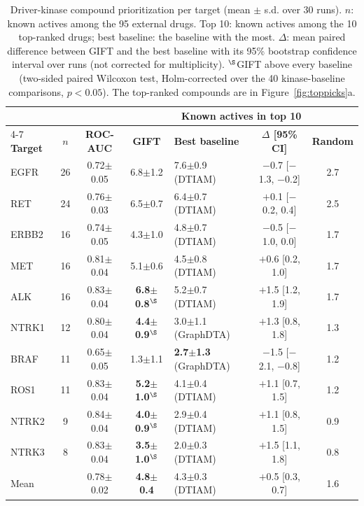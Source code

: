 \documentclass[10pt,letterpaper]{article}
\begin{document}
\begin{table}[t]
\centering
\caption{Driver-kinase compound prioritization per target (mean $\pm$ s.d. over 30 runs). $n$: known actives among the 95 external drugs. Top 10: known actives among the 10 top-ranked drugs; best baseline: the baseline with the most. $\Delta$: mean paired difference between GIFT and the best baseline with its 95\% bootstrap confidence interval over runs (not corrected for multiplicity). $^{\S}$GIFT above every baseline (two-sided paired Wilcoxon test, Holm-corrected over the 40 kinase-baseline comparisons, $p<0.05$). The top-ranked compounds are in Figure~\ref{fig:toppicks}a.}
\label{tab:leadprio_kinases}
\footnotesize
\setlength{\tabcolsep}{3.5pt}
\begin{tabular}{l c c c l c c}
\toprule
 & & & \multicolumn{4}{c}{\textbf{Known actives in top 10}} \\
\cmidrule(lr){4-7}
\textbf{Target} & $n$ & \textbf{ROC-AUC} & \textbf{GIFT} & \textbf{Best baseline} & \textbf{$\Delta$ [95\% CI]} & \textbf{Random} \\
\midrule
EGFR & 26 & 0.72$\pm$0.05 & 6.8$\pm$1.2 & 7.6$\pm$0.9 (DTIAM) & $-$0.7 [$-$1.3, $-$0.2] & 2.7 \\
RET & 24 & 0.76$\pm$0.03 & 6.5$\pm$0.7 & 6.4$\pm$0.7 (DTIAM) & $+$0.1 [$-$0.2, 0.4] & 2.5 \\
ERBB2 & 16 & 0.74$\pm$0.05 & 4.3$\pm$1.0 & 4.8$\pm$0.7 (DTIAM) & $-$0.5 [$-$1.0, 0.0] & 1.7 \\
MET & 16 & 0.81$\pm$0.04 & 5.1$\pm$0.6 & 4.5$\pm$0.8 (DTIAM) & $+$0.6 [0.2, 1.0] & 1.7 \\
ALK & 16 & 0.83$\pm$0.04 & \textbf{6.8$\pm$0.8}$^{\S}$ & 5.2$\pm$0.7 (DTIAM) & $+$1.5 [1.2, 1.9] & 1.7 \\
NTRK1 & 12 & 0.80$\pm$0.04 & \textbf{4.4$\pm$0.9}$^{\S}$ & 3.0$\pm$1.1 (GraphDTA) & $+$1.3 [0.8, 1.8] & 1.3 \\
BRAF & 11 & 0.65$\pm$0.05 & 1.3$\pm$1.1 & \textbf{2.7$\pm$1.3} (GraphDTA) & $-$1.5 [$-$2.1, $-$0.8] & 1.2 \\
ROS1 & 11 & 0.83$\pm$0.04 & \textbf{5.2$\pm$1.0}$^{\S}$ & 4.1$\pm$0.4 (DTIAM) & $+$1.1 [0.7, 1.5] & 1.2 \\
NTRK2 & 9 & 0.84$\pm$0.04 & \textbf{4.0$\pm$0.9}$^{\S}$ & 2.9$\pm$0.4 (DTIAM) & $+$1.1 [0.8, 1.5] & 0.9 \\
NTRK3 & 8 & 0.83$\pm$0.04 & \textbf{3.5$\pm$1.0}$^{\S}$ & 2.0$\pm$0.3 (DTIAM) & $+$1.5 [1.1, 1.8] & 0.8 \\
\midrule
Mean & & 0.78$\pm$0.02 & \textbf{4.8$\pm$0.4} & 4.3$\pm$0.3 (DTIAM) & $+$0.5 [0.3, 0.7] & 1.6 \\
\bottomrule
\end{tabular}
\end{table}
\end{document}
